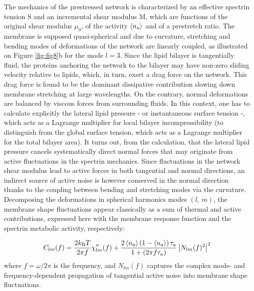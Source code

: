 \documentclass[graybox]{svmult}
\begin{document}
The mechanics of the prestressed network is characterized by an effective spectrin tension S and an incremental shear modulus M, which are functions of the original shear modulus $\mu_0$, of the activity $\left\langle n_{\rm{a}} \right\rangle$ and of a prestretch ratio. The membrane is supposed quasi-spherical and due to curvature, stretching and bending modes of deformations of the network are linearly coupled, as illustrated on Figure \ref{fig:fig8}b for the mode $l = 3$. Since the lipid bilayer is tangentially fluid, the proteins anchoring the network to the bilayer may have non-zero sliding velocity relative to lipids, which, in turn, exert a drag force on the network. This drag force is found to be the dominant dissipative contribution slowing down membrane stretching at large wavelengths. On the contrary, normal deformations are balanced by viscous forces from surrounding fluids. In this context, one has to calculate explicitly the lateral lipid pressure - or instantaneous surface tension -, which acts as a Lagrange multiplier for local bilayer incompressibility (to distinguish from the global surface tension, which acts as a Lagrange multiplier for the total bilayer area). It turns out, from the calculation, that the lateral lipid pressure cancels systematically direct normal forces that may originate from active fluctuations in the spectrin mechanics. Since fluctuations in the network shear modulus lead to active forces in both tangential and normal directions, an indirect source of active noise is however conserved in the normal direction thanks to the coupling between bending and stretching modes via the curvature. 
Decomposing the deformations in spherical harmonics modes $(l,\,m)$, the membrane shape fluctuations appear classically as a sum of thermal and active contributions, expressed here with the membrane response function and the spectrin metabolic activity, respectively:

\begin{equation}
 C_{lm}(f) = \frac{2k_{\rm{B}}T}{2\pi f}\chi_{lm}''(f) + \frac{2\left\langle n_{\rm{a}} \right\rangle\left( 1- \left\langle n_{\rm{a}} \right\rangle \right)\tau_{\rm{a}}}{1 + \left(2\pi f \tau_{a}\right)} \left| N_{lm}(f)^2 \right|^2
 \label{eq: }
\end{equation}
where $f = \omega/ 2\pi$ is the frequency, and $N_{lm}(f)$ captures the complex mode- and frequency-dependent propagation of tangential active noise into membrane shape fluctuations.
\end{document}

